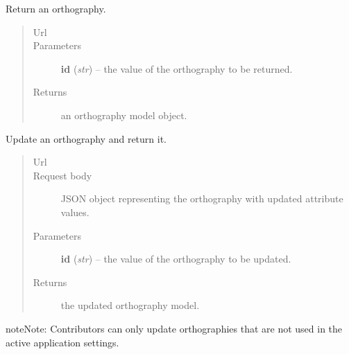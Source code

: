 \documentclass[letterpaper,10pt,english]{sphinxmanual}
\begin{document}
\begin{fulllineitems}
\begin{fulllineitems}
\begin{quote}
\begin{description}
\end{description}\end{quote}

\end{fulllineitems}


\begin{fulllineitems}
\label{api:onlinelinguisticdatabase.controllers.orthographies.OrthographiesController.show}
Return an orthography.
\begin{quote}\begin{description}
\item[{Url }] \leavevmode
{}

\item[{Parameters}] \leavevmode
\textbf{id} (\emph{str}) -- the  value of the orthography to be returned.

\item[{Returns}] \leavevmode
an orthography model object.

\end{description}\end{quote}

\end{fulllineitems}


\begin{fulllineitems}
\label{api:onlinelinguisticdatabase.controllers.orthographies.OrthographiesController.update}
Update an orthography and return it.
\begin{quote}\begin{description}
\item[{Url }] \leavevmode
{}

\item[{Request body}] \leavevmode
JSON object representing the orthography with updated attribute values.

\item[{Parameters}] \leavevmode
\textbf{id} (\emph{str}) -- the  value of the orthography to be updated.

\item[{Returns}] \leavevmode
the updated orthography model.

\end{description}\end{quote}

\begin{notice}{note}{Note:}
Contributors can only update orthographies that are not used in the
active application settings.
\end{notice}

\end{fulllineitems}


\end{fulllineitems}
\end{document}
